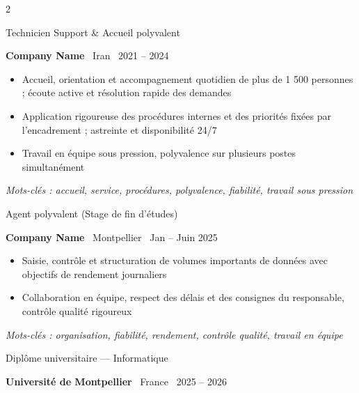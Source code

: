 \documentclass[7pt,a4paper,withhyper]{altacv}
\renewcommand{\cvevent}[4]{%
  {\large\color{emphasis}\raggedright #1\par}
  \smallskip\normalsize
  \ifstrequal{#2}{}{}{%
    \textbf{\color{accent}#2}%
  }%
  \ifstrequal{#4}{}{}{%
    \ifstrequal{#2}{}{}{\hspace{1.5em}}%
    {\small\cvLocationMarker~#4}%
  }%
  \ifstrequal{#3}{}{}{%
    \hfill{\small\cvDateMarker~#3}%
  }\par
}
\begin{document}
\begin{paracol}{2}
\cvevent{Technicien Support \& Accueil polyvalent}{Company Name}{2021 – 2024}{Iran}
\smallskip
\begin{itemize}[leftmargin=1.25em, itemsep=0pt, parsep=0pt]
\item \justifying Accueil, orientation et accompagnement quotidien de plus de 1 500 personnes ; écoute active et résolution rapide des demandes
\item \justifying Application rigoureuse des procédures internes et des priorités fixées par l'encadrement ; astreinte et disponibilité 24/7
\item \justifying Travail en équipe sous pression, polyvalence sur plusieurs postes simultanément
\end{itemize}
\smallskip\noindent\textit{Mots-clés : accueil, service, procédures, polyvalence, fiabilité, travail sous pression}\par

\vspace{0.2em}\par\vspace{0.2em}

\cvevent{Agent polyvalent (Stage de fin d'études)}{Company Name}{Jan – Juin 2025}{Montpellier}
\smallskip
\begin{itemize}[leftmargin=1.25em, itemsep=0pt, parsep=0pt]
\item \justifying Saisie, contrôle et structuration de volumes importants de données avec objectifs de rendement journaliers
\item \justifying Collaboration en équipe, respect des délais et des consignes du responsable, contrôle qualité rigoureux
\end{itemize}
\smallskip\noindent\textit{Mots-clés : organisation, fiabilité, rendement, contrôle qualité, travail en équipe}\par

\vspace{0.2em}\par\vspace{0.2em}

\cvevent{Diplôme universitaire — Informatique}{Université de Montpellier}{2025 – 2026}{France}\par

\end{paracol}
\end{document}
